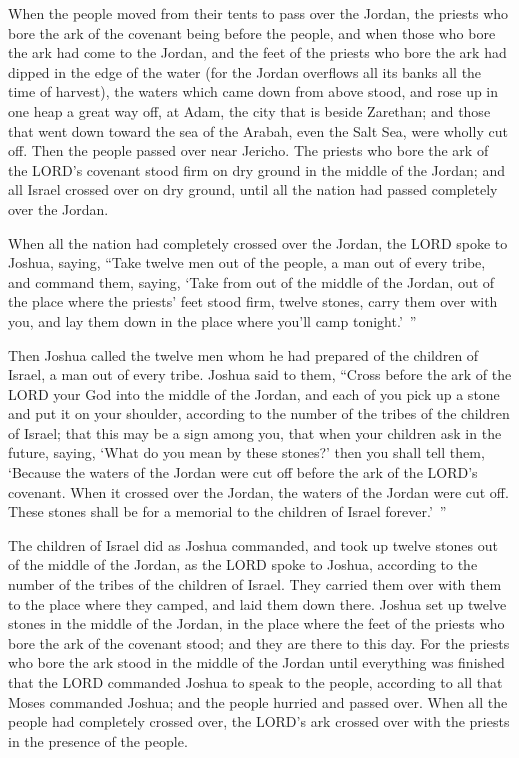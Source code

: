 \myverse{}When the people moved from their tents to pass over the Jordan,
the priests who bore the ark of the covenant being before the people,
\myverse{}and when those who bore the ark had come to the Jordan, and the feet of the
priests who bore the ark had dipped in the edge of the water (for the Jordan overflows all its banks all
the time of harvest),
\myverse{}the waters which came down from above stood, and rose up in one heap a great
way off, at Adam, the city that is beside Zarethan; and those that went down toward the sea of the Arabah,
even the Salt Sea, were wholly cut off. Then the people passed over near Jericho.
\myverse{}The priests who bore the ark of the LORD’s covenant stood firm on dry ground
in the middle of the Jordan; and all Israel crossed over on dry ground, until all the nation had passed
completely over the Jordan.


\mychapter{} \myverse*{}When all the nation had completely crossed over the Jordan, the
LORD spoke to Joshua, saying,
\myverse{}“Take twelve men out of the people, a man out of every tribe,
\myverse{}and command them, saying, ‘Take from out of the middle of the Jordan, out of
the place where the priests’ feet stood firm, twelve stones, carry them over with you, and lay them down
in the place where you’ll camp tonight.’ ”

\myverse{}Then Joshua called the twelve men whom he had prepared of the children
of Israel, a man out of every tribe.
\myverse{}Joshua said to them, “Cross before the ark of the LORD your God into the middle
of the Jordan, and each of you pick up a stone and put it on your shoulder, according to the number of
the tribes of the children of Israel;
\myverse{}that this may be a sign among you, that when your children ask in the future,
saying, ‘What do you mean by these stones?’
\myverse{}then you shall tell them, ‘Because the waters of the Jordan were cut off before
the ark of the LORD’s covenant. When it crossed over the Jordan, the waters of the Jordan were cut off.
These stones shall be for a memorial to the children of Israel forever.’ ”

\myverse{}The children of Israel did as Joshua commanded, and took up twelve
stones out of the middle of the Jordan, as the LORD spoke to Joshua, according to the number of the tribes
of the children of Israel. They carried them over with them to the place where they camped, and laid them
down there.
\myverse{}Joshua set up twelve stones in the middle of the Jordan, in the place where
the feet of the priests who bore the ark of the covenant stood; and they are there to this day.
\myverse{}For the priests who bore the ark stood in the middle of the Jordan until everything
was finished that the LORD commanded Joshua to speak to the people, according to all that Moses commanded
Joshua; and the people hurried and passed over.
\myverse{}When all the people had completely crossed over, the LORD’s ark crossed over
with the priests in the presence of the people.

